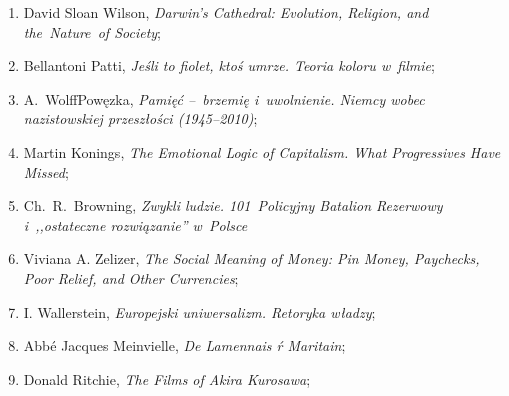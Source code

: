 \documentclass[a4paper,11pt]{article}
\begin{document}
\begin{enumerate}
\item David Sloan Wilson, \emph{Darwin's Cathedral: Evolution,
    Religion, and the~Nature~of Society};
\item Bellantoni Patti, \emph{Jeśli to fiolet, ktoś umrze. Teoria
    koloru w~filmie};
\item A.~Wolff\dywiz Powęzka, \emph{Pamięć --~brzemię i~uwolnienie.
    Niemcy wobec nazistowskiej przeszłości (1945--2010)};
\item Martin Konings, \emph{The Emotional Logic of Capitalism. What
    Progressives Have Missed};
\item Ch.~R.~Browning, \emph{Zwykli ludzie. 101~Policyjny Batalion
    Rezerwowy i~,,ostateczne rozwiązanie'' w~Polsce}
\item Viviana A. Zelizer, \emph{The Social Meaning of Money: Pin
    Money, Paychecks, Poor Relief, and Other Currencies};
\item I. Wallerstein, \emph{Europejski uniwersalizm. Retoryka władzy};
\item Abbé Jacques Meinvielle, \emph{De Lamennais ŕ Maritain};
\item Donald Ritchie, \emph{The Films of Akira Kurosawa};
\end{enumerate}




\end{document}
